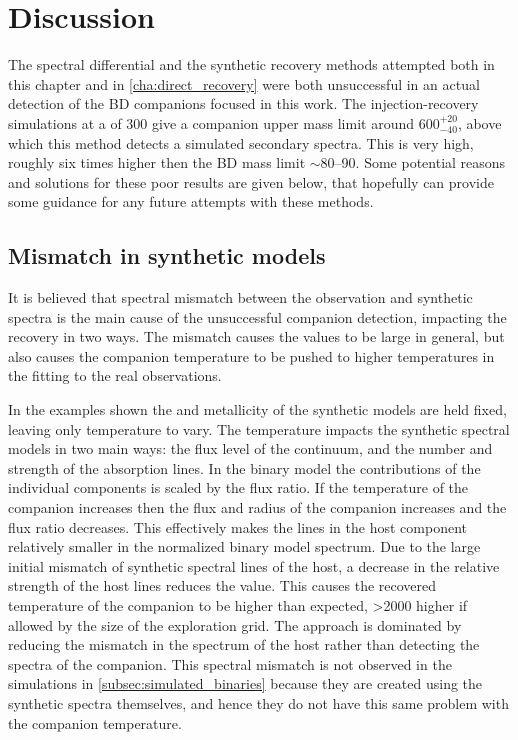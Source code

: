 
\section{Discussion}
\label{sec:chisquared_discussion}
The spectral differential and the synthetic recovery methods attempted both in this chapter and in \cref{cha:direct_recovery} were both unsuccessful in an actual detection of the {BD} companions focused in this work.
The injection-recovery simulations at a \snr{} of 300 give a companion upper mass limit around \(600^{+20}_{-40}\), above which this method detects a simulated secondary spectra.
This is very high, roughly six times higher then the {BD} mass limit \(\sim\)80--90\Mjup{}.
Some potential reasons and solutions for these poor results are given below, that hopefully can provide some guidance for any future attempts with these methods.

\subsection{Mismatch in synthetic models}
\label{subsec:mismatch}
It is believed that spectral mismatch between the observation and synthetic spectra is the main cause of the unsuccessful companion detection, impacting the recovery in two ways.
The mismatch causes the \textchisquared{} values to be large in general, but also causes the companion temperature to be pushed to higher temperatures in the  fitting to the real observations.

In the examples shown the \Logg{} and metallicity of the synthetic models are held fixed, leaving only temperature to vary.
The temperature impacts the synthetic spectral models in two main ways: the flux level of the continuum, and the number and strength of the absorption lines.
In the binary model the contributions of the individual components is scaled by the flux ratio.
If the temperature of the companion increases then the flux and radius of the companion increases and the flux ratio \FoneFtwo{} decreases.
This effectively makes the lines in the host component relatively smaller in the normalized binary model spectrum.
Due to the large initial mismatch of synthetic spectral lines of the host, a decrease in the relative strength of the host lines reduces the \textchisquared{} value.
This causes the recovered temperature of the companion to be higher than expected, >2000\K{} higher if allowed by the size of the exploration grid.
The \textchisquared{} approach is dominated by reducing the mismatch in the spectrum of the host rather than detecting the spectra of the companion.
This spectral mismatch is not observed in the simulations in \cref{subsec:simulated_binaries} because they are created using the synthetic spectra themselves, and hence they do not have this same problem with the companion temperature.


